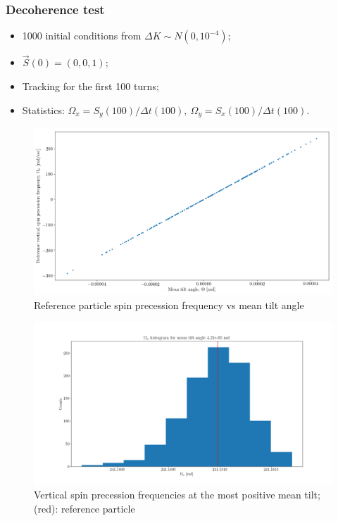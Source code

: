 \documentclass[pdf]{beamer}
\begin{document}
	\begin{frame}
		\frametitle{Decoherence test}
		\begin{itemize}
			\item 1000 initial conditions from $\Delta K \sim N(0, 10^{-4})$;
			\item $\vec{S}(0) = (0,0,1)$;
			\item Tracking for the first 100 turns;
			\item Statistics: $\Omega_x = S_y(100) / \Delta t(100), ~ \Omega_y = S_x(100) / \Delta t(100)$.
		\end{itemize}
		\begin{figure}
			\includegraphics[scale=.25]{Wx_dK_reference_vs_tilt_mean_cut}
			\caption{Reference particle spin precession frequency vs mean tilt angle}
		\end{figure}
	\end{frame}
	\begin{frame}
		\begin{figure}
			\includegraphics[scale=.3]{Wx_dK_hist_most_positive_mean_tilt}
			\caption{Vertical spin precession frequencies at the most positive mean tilt; (red): reference particle}
		\end{figure}
	\end{frame}
\end{document}
